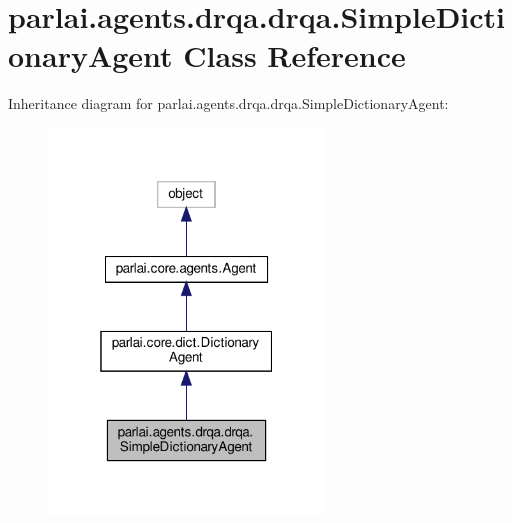 \hypertarget{classparlai_1_1agents_1_1drqa_1_1drqa_1_1SimpleDictionaryAgent}{}\section{parlai.\+agents.\+drqa.\+drqa.\+Simple\+Dictionary\+Agent Class Reference}
\label{classparlai_1_1agents_1_1drqa_1_1drqa_1_1SimpleDictionaryAgent}


Inheritance diagram for parlai.\+agents.\+drqa.\+drqa.\+Simple\+Dictionary\+Agent\+:
\nopagebreak
\begin{figure}[H]
\begin{center}
\leavevmode
\includegraphics[width=208pt]{classparlai_1_1agents_1_1drqa_1_1drqa_1_1SimpleDictionaryAgent__inherit__graph}
\end{center}
\end{figure}


